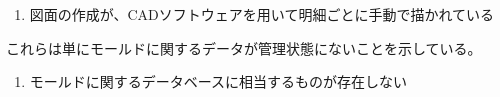 \begin{Tabbox}[title={図面の作成}]
\begin{enumerate}
\item 図面の作成が、CADソフトウェアを用いて明細ごとに手動で描かれている
\end{enumerate}
\end{Tabbox}
これらは単にモールドに関するデータが管理状態にないことを示している。
\begin{Tabbox}[title={非管理状態のモールドデータ}]
\begin{enumerate}
\item モールドに関するデータベースに相当するものが存在しない
\end{enumerate}
\end{Tabbox}





